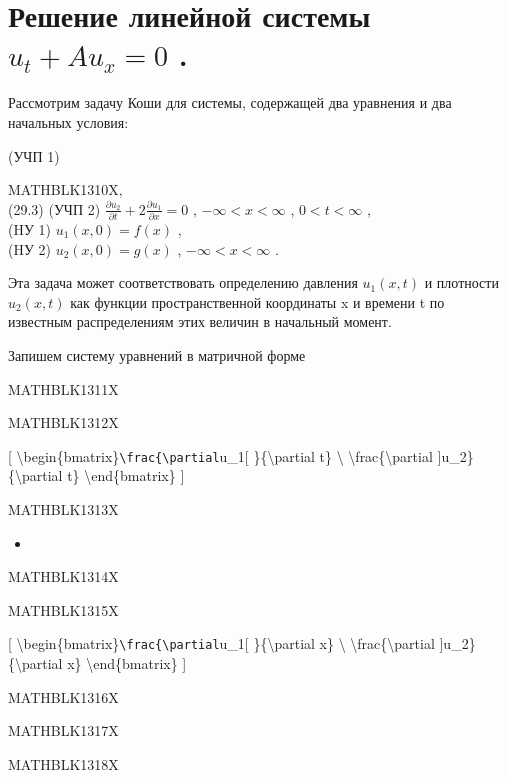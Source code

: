 \documentclass[
]{article}
\providecommand{\tightlist}{%
  \setlength{\itemsep}{0pt}\setlength{\parskip}{0pt}}
\begin{document}
{{{\section{\texorpdfstring{Решение линейной системы \(u_t + Au_x = 0\)
.}{Решение линейной системы u\_t + Au\_x = 0 .}}\label{ux440ux435ux448ux435ux43dux438ux435-ux43bux438ux43dux435ux439ux43dux43eux439-ux441ux438ux441ux442ux435ux43cux44b-u_t-au_x-0-.}

Рассмотрим задачу Коши для системы, содержащей два уравнения и два
начальных условия:

(УЧП 1)

MATHBLK1310X,\\
(29.3) (УЧП 2)
\(\frac{\partial u_2}{\partial t} + 2 \frac{\partial u_1}{\partial x} = 0\)
, \(-\infty < x < \infty\) , \(0 < t < \infty\) ,\\
(HУ 1) \(u_1(x, 0) = f(x)\) ,\\
(HУ 2) \(u_2(x, 0) = g(x)\) , \(-\infty < x < \infty\) .

Эта задача может соответствовать определению давления \(u_1(x, t)\) и
плотности \(u_2(x, t)\) как функции пространственной координаты x и
времени t по известным распределениям этих величин в начальный момент.

Запишем систему уравнений в матричной форме

MATHBLK1311X

MATHBLK1312X

{[}
\textbackslash begin\{bmatrix\}\texttt{\textbackslash{}frac\{\textbackslash{}partial}u\_1{[}
\}\{\textbackslash partial t\} \textbackslash{}
\textbackslash frac\{\textbackslash partial
{]}u\_2\}\{\textbackslash partial t\} \textbackslash end\{bmatrix\} {]}

MATHBLK1313X

\begin{itemize}
\tightlist
\item
\end{itemize}

MATHBLK1314X

MATHBLK1315X

{[}
\textbackslash begin\{bmatrix\}\texttt{\textbackslash{}frac\{\textbackslash{}partial}u\_1{[}
\}\{\textbackslash partial x\} \textbackslash{}
\textbackslash frac\{\textbackslash partial
{]}u\_2\}\{\textbackslash partial x\} \textbackslash end\{bmatrix\} {]}

MATHBLK1316X

MATHBLK1317X

MATHBLK1318X

}}}
\end{document}

